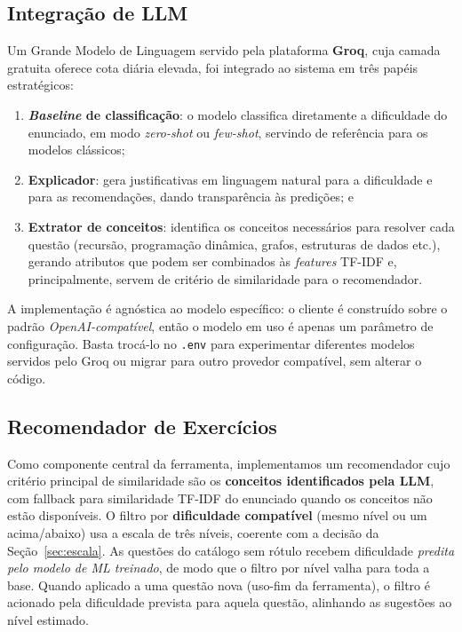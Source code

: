 \documentclass[sigconf]{webmedia}
\begin{document}
\subsection{Integração de LLM}

Um Grande Modelo de Linguagem servido pela plataforma \textbf{Groq}, cuja camada gratuita oferece cota diária elevada, foi integrado ao sistema em três papéis estratégicos:
\begin{enumerate}
  \item \textbf{\textit{Baseline} de classificação}: o modelo classifica diretamente a dificuldade do enunciado, em modo \textit{zero-shot} ou \textit{few-shot}, servindo de referência para os modelos clássicos;
  \item \textbf{Explicador}: gera justificativas em linguagem natural para a dificuldade e para as recomendações, dando transparência às predições; e
  \item \textbf{Extrator de conceitos}: identifica os conceitos necessários para resolver cada questão (recursão, programação dinâmica, grafos, estruturas de dados etc.), gerando atributos que podem ser combinados às \textit{features} TF-IDF e, principalmente, servem de critério de similaridade para o recomendador.
\end{enumerate}
A implementação é agnóstica ao modelo específico: o cliente é construído sobre o padrão \textit{OpenAI-compatível}, então o modelo em uso é apenas um parâmetro de configuração. Basta trocá-lo no \texttt{.env} para experimentar diferentes modelos servidos pelo Groq ou migrar para outro provedor compatível, sem alterar o código.

\subsection{Recomendador de Exercícios}
\label{sec:recomendador}

Como componente central da ferramenta, implementamos um recomendador cujo critério principal de similaridade são os \textbf{conceitos identificados pela LLM}, com fallback para similaridade TF-IDF do enunciado quando os conceitos não estão disponíveis. O filtro por \textbf{dificuldade compatível} (mesmo nível ou um acima/abaixo) usa a escala de três níveis, coerente com a decisão da Seção~\ref{sec:escala}. As questões do catálogo sem rótulo recebem dificuldade \emph{predita pelo modelo de ML treinado}, de modo que o filtro por nível valha para toda a base. Quando aplicado a uma questão nova (uso-fim da ferramenta), o filtro é acionado pela dificuldade prevista para aquela questão, alinhando as sugestões ao nível estimado.
\end{document}

